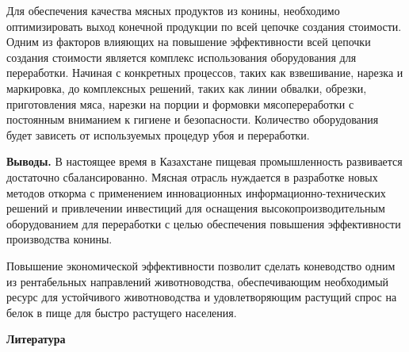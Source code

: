 \begin{multicols}{2}
Для обеспечения качества мясных продуктов из конины, необходимо
оптимизировать выход конечной продукции по всей цепочке создания
стоимости. Одним из факторов влияющих на повышение эффективности всей
цепочки создания стоимости является комплекс использования оборудования
для переработки. Начиная с конкретных процессов, таких как взвешивание,
нарезка и маркировка, до комплексных решений, таких как линии обвалки,
обрезки, приготовления мяса, нарезки на порции и формовки
мясопереработки с постоянным вниманием к гигиене и безопасности.
Количество оборудования будет зависеть от используемых процедур убоя и
переработки.

{\bfseries Выводы.} В настоящее время в Казахстане пищевая промышленность
развивается достаточно сбалансированно. Мясная отрасль нуждается в
разработке новых методов откорма с применением инновационных
информационно-технических решений и привлечении инвестиций для оснащения
высокопроизводительным оборудованием для переработки с целью обеспечения
повышения эффективности производства конины.

Повышение экономической эффективности позволит сделать коневодство одним
из рентабельных направлений животноводства, обеспечивающим необходимый
ресурс для устойчивого животноводства и удовлетворяющим растущий спрос
на белок в пище для быстро растущего населения.
\end{multicols}


\begin{center}
	{\bfseries Литература}
\end{center}

